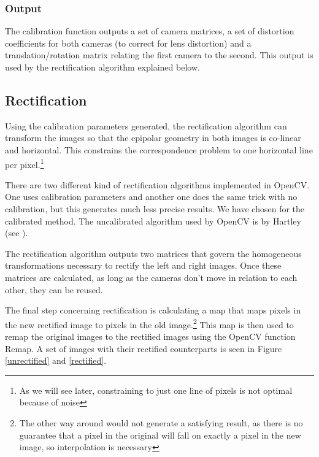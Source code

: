 \documentclass[a4paper]{article}
\begin{document}
\subsubsection{Output} The calibration function outputs a set of
camera matrices, a set of distortion coefficients for both cameras (to
correct for lens distortion) and a translation/rotation matrix
relating the first camera to the second. This output is used by the
rectification algorithm explained below.

\subsection{Rectification} Using the calibration parameters generated,
the rectification algorithm can transform the images so that the
epipolar geometry in both images is co-linear and horizontal. This
constrains the correspondence problem to one horizontal line per
pixel.\footnote{As we will see later, constraining to just one line of
pixels is not optimal because of noise}

There are two different kind of rectification algorithms implemented
in OpenCV. One uses calibration parameters and another one does the
same trick with no calibration, but this generates much less precise
results. We have chosen for the calibrated method. The uncalibrated
algorithm used by OpenCV is by Hartley (see \cite{Hartley99}).

The rectification algorithm outputs two matrices that govern the
homogeneous transformations necessary to rectify the left and right
images. Once these matrices are calculated, as long as the cameras
don't move in relation to each other, they can be reused.

The final step concerning rectification is calculating a map that maps
pixels in the new rectified image to pixels in the old
image.\footnote{The other way around would not generate a satisfying
result, as there is no guarantee that a pixel in the original will
fall on exactly a pixel in the new image, so interpolation is
necessary} This map is then used to remap the original images to the
rectified images using the OpenCV function Remap. A set of images with
their rectified counterparts is seen in Figure \ref{unrectified} and
\ref{rectified}.
\end{document}
